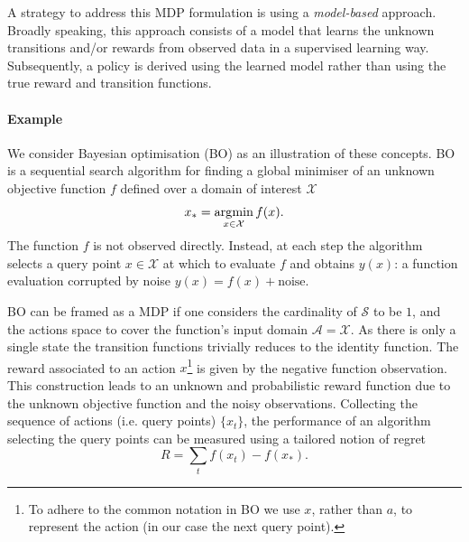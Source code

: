A strategy to address this MDP formulation is using a \emph{model-based} approach. Broadly speaking, this approach consists of a model that learns the unknown transitions and/or rewards from observed data in a supervised learning way. Subsequently, a policy is derived using the learned model rather than using the true reward and transition functions. %

\paragraph{Example}
We consider Bayesian optimisation (BO) \citep{movckus1975bayesian} as an illustration of these concepts. BO is a sequential search algorithm for finding a global minimiser of an unknown objective function $f$ defined over a domain of interest $\mathcal{X}$
\begin{equation}
    x_* = \operatorname*{\arg\!\min}_{x \in \mathcal{X}} f(x).
\end{equation}
The function $f$ is not observed directly. Instead, at each step the algorithm selects a query point $x \in \mathcal{X}$ at which to evaluate $f$ and obtains $y(x)$: a function evaluation corrupted by noise $y(x) = f(x) + \textrm{noise}$.

BO can be framed as a MDP if one considers the cardinality of $\mathcal{S}$ to be $1$, and the actions space to cover the function's input domain $\mathcal{A} = \mathcal{X}$. As there is only a single state the transition functions trivially reduces to the identity function. The reward associated to an action $x$\footnote{To adhere to the common notation in BO we use $x$, rather than $a$, to represent the action (in our case the next query point).} is given by the negative function observation. This construction leads to an unknown and probabilistic reward  function due to the unknown objective function and the noisy observations. Collecting the sequence of actions (i.e. query points) $\{x_t\}$, the performance of an algorithm selecting the query points can be measured using a tailored notion of regret
\begin{equation}
  \label{eq:regret-bo}
    R = \sum_t f(x_t) - f(x_*).
\end{equation}

